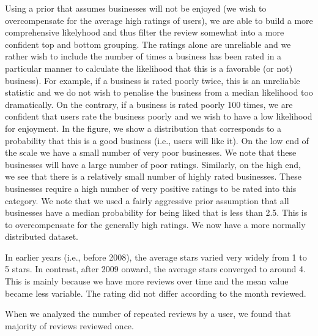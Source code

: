 \documentclass[11pt]{article}
\begin{document}
\par Using a prior that assumes businesses will not be enjoyed (we wish to overcompensate for the average high ratings of users), we are able to build a more comprehensive likelyhood and thus filter the review somewhat into a more confident top and bottom grouping. The ratings alone are unreliable and we rather wish to include the number of times a business has been rated in a particular manner to calculate the likelihood that this is a favorable (or not) business). For example, if a business is rated poorly twice, this is an unreliable statistic and we do not wish to penalise the business from a median likelihood too dramatically. On the contrary, if a business is rated poorly 100 times, we are confident that users rate the business poorly and we wish to have a low likelihood for enjoyment. In the figure, we show a distribution that corresponds to a probability that this is a good business (i.e., users will like it). On the low end of the scale we have a small number of very poor businesses. We note that these businesses will have a large number of poor ratings. Similarly, on the high end, we see that there is a relatively small number of highly rated businesses. These businesses require a high number of very positive ratings to be rated into this category. We note that we used a fairly aggressive prior assumption that all businesses have a median probability for being liked that is less than 2.5. This is to overcompensate for the generally high ratings. We now have a more normally distributed dataset.



\par In earlier years (i.e., before 2008), the average stars varied very widely from 1 to 5 stars. In contrast, after 2009 onward, the average stars converged to around 4. This is mainly because we have more reviews over time and the mean value became less variable. The rating did not differ according to the month reviewed.

\par When we analyzed the number of repeated reviews by a user, we found that majority of reviews reviewed once.
\end{document}
